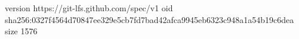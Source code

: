 version https://git-lfs.github.com/spec/v1
oid sha256:0327f4564d70847ee329e5cb7fd7bad42afca9945eb6323c948a1a54b19c6dea
size 1576
